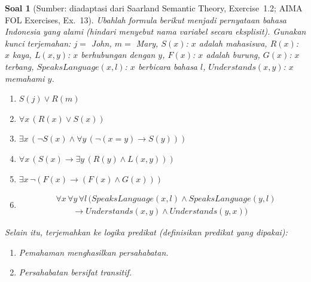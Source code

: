 \documentclass[12pt,a4paper]{article}
\theoremstyle{soaljarak}
\newtheorem{soal}{Soal}
\begin{document}
\begin{soal}[\normalfont Sumber: diadaptasi dari Saarland Semantic Theory, Exercise~1.2; AIMA FOL Exercises, Ex.~13]
  Ubahlah formula berikut menjadi pernyataan bahasa Indonesia yang alami (hindari menyebut nama variabel secara eksplisit).
  Gunakan kunci terjemahan:
  \(j =\) John, \(m =\) Mary,
  \(S(x)\): \(x\) adalah mahasiswa,
  \(R(x)\): \(x\) kaya,
  \(L(x,y)\): \(x\) berhubungan dengan \(y\),
  \(F(x)\): \(x\) adalah burung,
  \(G(x)\): \(x\) terbang,
  \(\mathit{SpeaksLanguage}(x,l)\): \(x\) berbicara bahasa \(l\),
  \(\mathit{Understands}(x,y)\): \(x\) memahami \(y\).
  \begin{enumerate}
    \item \(S(j) \vee R(m)\)
    \item \(\forall x\,(R(x) \vee S(x))\)
    \item \(\exists x\,(\neg S(x) \wedge \forall y\,(\neg(x=y) \rightarrow S(y)))\)
    \item \(\forall x\,(S(x) \rightarrow \exists y\,(R(y) \wedge L(x,y)))\)
    \item \(\exists x\,\neg(F(x) \rightarrow (F(x) \wedge G(x)))\)
    \item
          \[
          \begin{aligned}
          &\forall x\,\forall y\,\forall l\,\bigl(
            \mathit{SpeaksLanguage}(x,l) \wedge \mathit{SpeaksLanguage}(y,l)\\
          &\qquad\rightarrow \mathit{Understands}(x,y) \wedge \mathit{Understands}(y,x)
          \bigr)
          \end{aligned}
          \]
  \end{enumerate}
  Selain itu, terjemahkan ke logika predikat (definisikan predikat yang dipakai):
  \begin{enumerate}[resume]
    \item Pemahaman menghasilkan persahabatan.
    \item Persahabatan bersifat transitif.
  \end{enumerate}
\end{soal}
\end{document}
